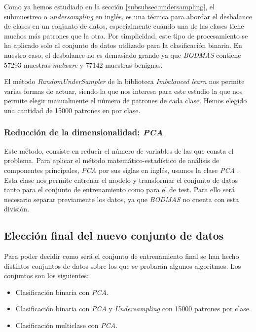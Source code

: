 Como ya hemos estudiado en la sección \ref{subsubsec:undersampling}, el submuestreo o \textit{undersampling} en inglés, es una técnica para abordar el desbalance de clases en un conjunto de datos, especialmente cuando una de las clases tiene muchos más patrones que la otra. Por simplicidad, este tipo de procesamiento se ha aplicado solo al conjunto de datos utilizado para la clasificación binaria. En nuestro caso, el desbalance no es demasiado grande ya que \textit{BODMAS} contiene 57293 muestras \textit{malware} y 77142 muestras benignas.

\vspace{1em}

El método \textit{RandomUnderSampler} \cite{randundersampler} de la biblioteca \textit{Imbalanced learn} nos permite varias formas de actuar, siendo la que nos interesa para este estudio la que nos permite elegir manualmente el número de patrones de cada clase. Hemos elegido una cantidad de 15000 patrones en por clase.

\subsubsection{Reducción de la dimensionalidad: \textit{PCA}}
\label{subsubsec:num_caract}

Este método, consiste en reducir el número de variables de las que consta el problema. Para aplicar el método matemático-estadístico de análisis de componentes principales, \textit{PCA} por sus siglas en inglés, usamos la clase \textit{PCA} \cite{sklearn_pca}. Esta clase nos permite entrenar el modelo y transformar el conjunto de datos tanto para el conjunto de entrenamiento como para el de test. Para ello será necesario separar previamente los datos, ya que \textit{BODMAS} no cuenta con esta división.

\subsection{Elección final del nuevo conjunto de datos}
\label{subsec:eleccion_dataset}

Para poder decidir como será el conjunto de entrenamiento final se han hecho distintos conjuntos de datos sobre los que se probarán algunos algoritmos. Los conjuntos son los siguientes:

\begin{itemize}
	\item Clasificación binaria con \textit{PCA}.
	\item Clasificación binaria con \textit{PCA} y \textit{Undersampling} con 15000 patrones por clase.
	\item Clasificación multiclase con \textit{PCA}.
\end{itemize}

